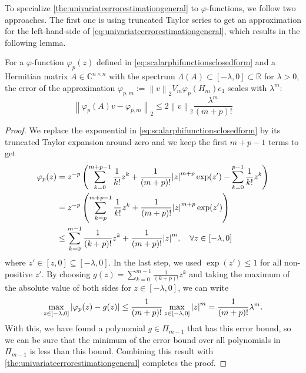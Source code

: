 To specialize \autoref{the:univariateerrorestimationgeneral} to $\varphi$-functions,
we follow two approaches. The first one is using truncated Taylor series to get an
approximation for the left-hand-side of \eqref{eq:univariateerrorestimationgeneral},
which results in the following lemma.

\begin{lemma}
    \label{lem:univariateerrorestimationphitaylor}
    For a $\varphi$-function $\varphi_p(z)$ defined in \eqref{eq:scalarphifunctionsclosedform}
    and a Hermitian matrix $A \in \mathbb{C}^{n \times n}$ with the spectrum
    $\Lambda(A) \subset [-\lambda, 0] \subset \mathbb{R}$ for $\lambda > 0$,
    the error of the approximation
    $\varphi_{p, m} := \left\| v \right\|_{2} V_m \varphi_p(H_m) e_1$
    scales with $\lambda^m$:
    \begin{equation}
        \label{eq:univariateerrorestimationphitaylor}
        \left\| \varphi_p(A)v - \varphi_{p, m} \right\|_2 \le 2 \left\| v \right\|_2
        \frac{\lambda^m}{(m+p)!}
    \end{equation}
\end{lemma}
\begin{proof}
    We replace the exponential in \eqref{eq:scalarphifunctionsclosedform} by its
    truncated Taylor expansion around zero and we keep the first $m+p-1$ terms to get
    \begin{equation*}
        \begin{aligned}
            \varphi_p(z) & = z^{-p} \left( \sum_{k=0}^{m+p-1}{\frac{1}{k!}z^k}
                + \frac{1}{(m+p)!} \abs{z}^{m+p} \exp(z') - \sum_{k=0}^{p-1}{\frac{1}{k!}z^{k}} \right)\\
            & = z^{-p} \left( \sum_{k=p}^{m+p-1}{\frac{1}{k!}z^k} + \frac{1}{(m+p)!} \abs{z}^{m+p} \exp(z') \right)\\
            & \le \sum_{k=0}^{m-1}{\frac{1}{(k+p)!}z^k} + \frac{1}{(m+p)!} \abs{z}^{m}, \quad \forall z \in [-\lambda, 0]
            \end{aligned}
    \end{equation*}
    where $z' \in [z, 0] \subseteq [-\lambda, 0]$. In the last step, we used $\exp(z') \le 1$ for all
    non-positive $z'$. By choosing $g(z) = \sum_{k=0}^{m-1}{\frac{1}{(k+p)!}z^k}$ and
    taking the maximum of the absolute value of both sides for $z \in [-\lambda, 0]$,
    we can write
    \begin{equation*}
        \max_{z \in [-\lambda, 0]}\left| \varphi_p(z) - g(z) \right|
        \le \frac{1}{(m+p)!} \max_{z \in [-\lambda, 0]}\abs{z}^{m}
        = \frac{1}{(m+p)!} \lambda^m.
    \end{equation*}
    With this, we have found a polynomial $g \in \Pi_{m-1}$ that has this error bound,
    so we can be sure that the minimum of the error bound over all polynomials in
    $\Pi_{m-1}$ is less than this bound. Combining this result with
    \autoref{the:univariateerrorestimationgeneral} completes the proof.
\end{proof}

